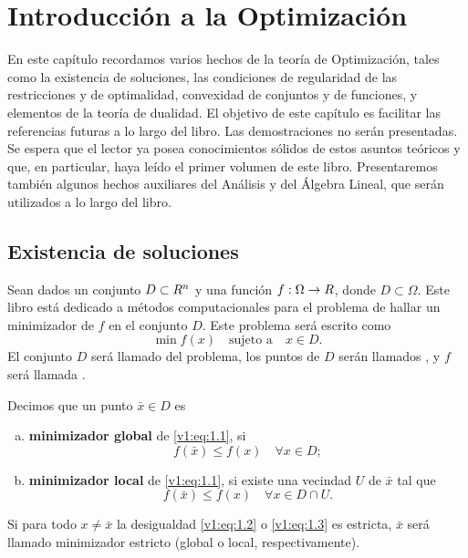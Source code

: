 
\chapter{Introducción a la Optimización}
\label{v1:chap:1}

En este capítulo recordamos varios hechos de la teoría de Optimización, tales como la existencia de soluciones, las condiciones de regularidad de las restricciones y de optimalidad, convexidad de conjuntos y de funciones, y elementos de la teoría de dualidad. El objetivo de este capítulo es facilitar las referencias futuras a lo largo del libro.
Las demostraciones no serán presentadas. Se espera que el lector ya posea conocimientos sólidos de estos asuntos teóricos y que, en particular, haya leído el primer volumen \cite{izmailov2020otimizacaovolume1} de este libro. Presentaremos también algunos hechos auxiliares del Análisis y del Álgebra Lineal, que serán utilizados a lo largo del libro.

\section{Existencia de soluciones}
\label{v1:sec:1.1}

Sean dados un conjunto $D \subset R^n$ y una función $f : \Omega \to R$, donde $D \subset \Omega$. Este libro está dedicado a métodos computacionales para el problema de hallar un minimizador de $f$ en el conjunto $D$. Este problema será escrito como
\begin{equation}
    \min f(x) \quad \text{sujeto a} \quad x \in D.
    \label{v1:eq:1.1}
\end{equation}
El conjunto $D$ será llamado  del problema, los puntos de $D$ serán llamados , y $f$ será llamada .

\begin{definition}\label{v1:def:1.1.1}
    Decimos que un punto $\bar{x} \in D$ es
    \begin{enumerate}[(a)]
        \item \textbf{minimizador global} de \eqref{v1:eq:1.1}, si
        \begin{equation}
            f(\bar{x}) \le f(x) \quad \forall x \in D;
            \label{v1:eq:1.2}
        \end{equation}
        \item \textbf{minimizador local} de \eqref{v1:eq:1.1}, si existe una vecindad $U$ de $\bar{x}$ tal que
        \begin{equation}
            f(\bar{x}) \le f(x) \quad \forall x \in D \cap U.
            \label{v1:eq:1.3}
        \end{equation}
    \end{enumerate}
    Si para todo $x \neq \bar{x}$ la desigualdad \eqref{v1:eq:1.2} o \eqref{v1:eq:1.3} es estricta, $\bar{x}$ será llamado minimizador estricto (global o local, respectivamente).
\end{definition}

